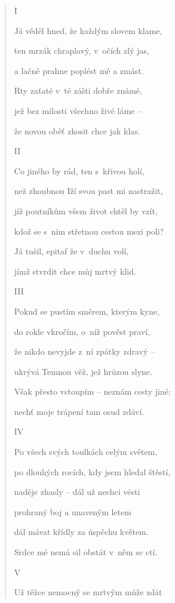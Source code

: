 

\begin{verse}

I

Já věděl hned, že každým slovem klame,

ten mrzák chraplavý, v~očích zlý jas,

a lačně prahne poplést mě a zmást.

Rty zaťaté v~té zášti dobře známé,

jež bez milosti všechno živé láme --

že novou oběť zkosit chce jak klas.


\medskip

II

Co jiného by rád, ten s~křivou holí,

než zhoubnou Iží svou past mi nastražit,

jíž poutníkům všem život chtěl by vzít,

kdož se s~ním střetnou cestou mezi poli?

Já tušil, epitaf že v~duchu volí,

jímž stvrdit chce můj mrtvý klid.

\medskip

III

Pokud se pustím směrem, kterým kyne,

do rokle vkročím, o~níž pověst praví,

že nikdo nevyjde z~ní zpátky zdravý --

ukrývá Temnou věž, jež hrůzou slyne.

Však přesto vstoupím -- neznám cesty jiné:

nechť moje trápení tam osud zdáví.

\medskip

IV

Po všech svých toulkách celým světem,

po dlouhých rocích, kdy jsem hledal štěstí,

naděje zhasly -- dál už nechci vésti

prohraný boj a unaveným letem

dál mávat křídly za úspěchu květem.

Srdce mé nemá sil obstát v~něm se ctí.

\medskip

V

Už těžce nemocný se mrtvým může zdát


\end{verse}
